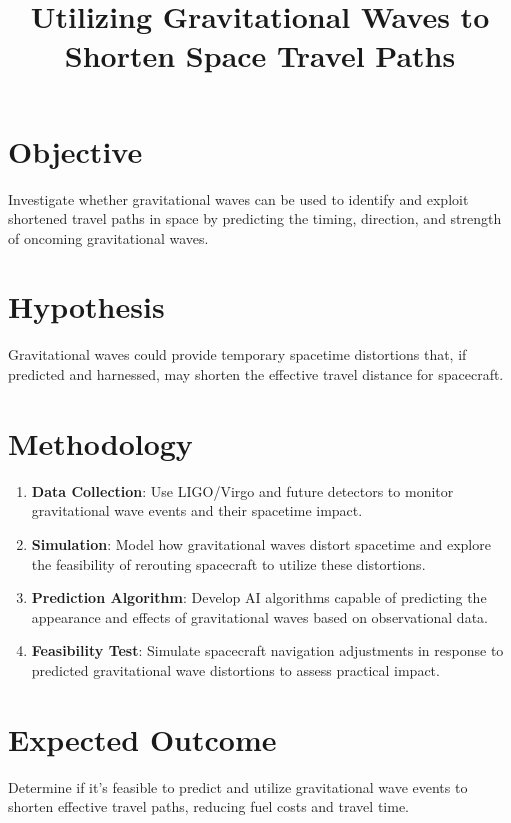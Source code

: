 \documentclass{article}
\title{Utilizing Gravitational Waves to Shorten Space Travel Paths}
\author{}
\date{}
\begin{document}
\maketitle

\section{Objective}
Investigate whether gravitational waves can be used to identify and exploit shortened travel paths in space by predicting the timing, direction, and strength of oncoming gravitational waves.

\section{Hypothesis}
Gravitational waves could provide temporary spacetime distortions that, if predicted and harnessed, may shorten the effective travel distance for spacecraft.

\section{Methodology}
\begin{enumerate}
    \item \textbf{Data Collection}: Use LIGO/Virgo and future detectors to monitor gravitational wave events and their spacetime impact.
    \item \textbf{Simulation}: Model how gravitational waves distort spacetime and explore the feasibility of rerouting spacecraft to utilize these distortions.
    \item \textbf{Prediction Algorithm}: Develop AI algorithms capable of predicting the appearance and effects of gravitational waves based on observational data.
    \item \textbf{Feasibility Test}: Simulate spacecraft navigation adjustments in response to predicted gravitational wave distortions to assess practical impact.
\end{enumerate}

\section{Expected Outcome}
Determine if it's feasible to predict and utilize gravitational wave events to shorten effective travel paths, reducing fuel costs and travel time.
\end{document}

